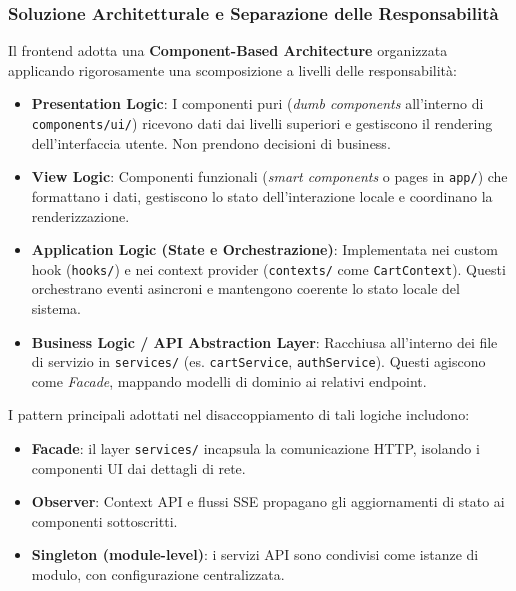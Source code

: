 \documentclass[a4paper, 11pt, oneside]{scrartcl}
\begin{document}
\subsubsection{Soluzione Architetturale e Separazione delle Responsabilità}
Il frontend adotta una \textbf{Component-Based Architecture} organizzata applicando rigorosamente una scomposizione a livelli delle responsabilità:
\begin{itemize}
    \item \textbf{Presentation Logic}: I componenti puri (\textit{dumb components} all'interno di \texttt{components/ui/}) ricevono dati dai livelli superiori e gestiscono il rendering dell'interfaccia utente. Non prendono decisioni di business.
    \item \textbf{View Logic}: Componenti funzionali (\textit{smart components} o pages in \texttt{app/}) che formattano i dati, gestiscono lo stato dell'interazione locale e coordinano la renderizzazione.
    \item \textbf{Application Logic (State e Orchestrazione)}: Implementata nei custom hook (\texttt{hooks/}) e nei context provider (\texttt{contexts/} come \texttt{CartContext}). Questi orchestrano eventi asincroni e mantengono coerente lo stato locale del sistema.
    \item \textbf{Business Logic / API Abstraction Layer}: Racchiusa all'interno dei file di servizio in \texttt{services/} (es. \texttt{cartService}, \texttt{authService}). Questi agiscono come \textit{Facade}, mappando modelli di dominio ai relativi endpoint.
\end{itemize}

I pattern principali adottati nel disaccoppiamento di tali logiche includono:
\begin{itemize}
    \item \textbf{Facade}: il layer \texttt{services/} incapsula la comunicazione HTTP, isolando i componenti UI dai dettagli di rete.
    \item \textbf{Observer}: Context API e flussi SSE propagano gli aggiornamenti di stato ai componenti sottoscritti.
    \item \textbf{Singleton (module-level)}: i servizi API sono condivisi come istanze di modulo, con configurazione centralizzata.
\end{itemize}
\end{document}
